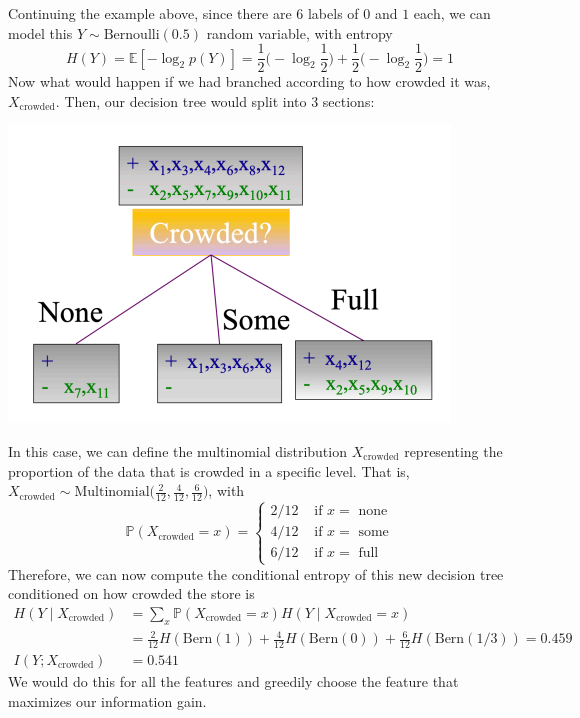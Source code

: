 \documentclass{article}
\begin{document}
    \begin{example}
      Continuing the example above, since there are $6$ labels of $0$ and $1$ each, we can model this $Y \sim \mathrm{Bernoulli}(0.5)$ random variable, with entropy 
      \[H(Y) = \mathbb{E}[-\log_2 p(Y)] = \frac{1}{2} \big( -\log_2 \frac{1}{2} \big) + \frac{1}{2} \big( -\log_2 \frac{1}{2} \big) = 1\]
      Now what would happen if we had branched according to how crowded it was, $X_{\mathrm{crowded}}$. Then, our decision tree would split into 3 sections: 
      \begin{center}
        \includegraphics[scale=0.5]{img/decision_crowded.png}
      \end{center}
      In this case, we can define the multinomial distribution $X_{\mathrm{crowded}}$ representing the proportion of the data that is crowded in a specific level. That is, $X_{\mathrm{crowded}} \sim \mathrm{Multinomial}(\frac{2}{12}, \frac{4}{12}, \frac{6}{12} \big)$, with 
      \[\mathbb{P}(X_{\mathrm{crowded}} = x) = \begin{cases} 2/12 & \text{ if } x = \text{ none} \\ 4/12 & \text{ if } x = \text{ some} \\ 6/12 & \text{ if } x = \text{ full} \end{cases} \]
      Therefore, we can now compute the conditional entropy of this new decision tree conditioned on how crowded the store is 
      \begin{align*}
          H(Y \mid X_{\mathrm{crowded}}) & = \sum_x \mathbb{P}(X_{\mathrm{crowded}} = x) H(Y \mid X_{\mathrm{crowded}} = x) \\
          & = \frac{2}{12} H(\mathrm{Bern}(1)) + \frac{4}{12} H(\mathrm{Bern}(0)) + \frac{6}{12} H(\mathrm{Bern}(1/3)) = 0.459 \\
          I(Y; X_{\mathrm{crowded}}) & = 0.541
      \end{align*}
      We would do this for all the features and greedily choose the feature that maximizes our information gain. 
    \end{example}
\end{document}
